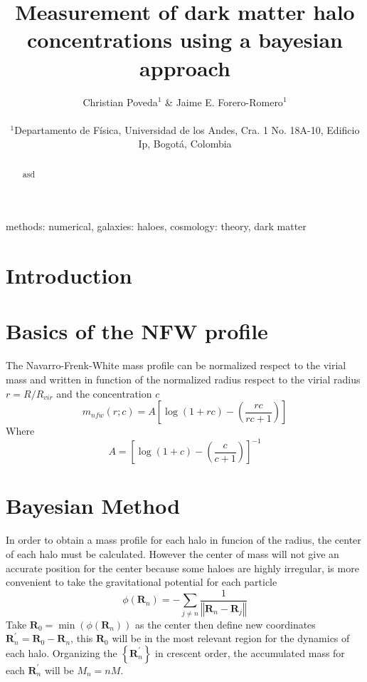 \documentclass[useAMS,usenatbib]{mn2e}
\begin{document}
\title[Bayesian halo concentration]{Measurement of dark matter halo concentrations using a bayesian approach}
\author[Poveda \& Forero-Romero]{
\parbox[t]{\textwidth}{\raggedright
  Christian Poveda$^{1}$ \&
  Jaime E. Forero-Romero$^{1}$
}
\vspace*{6pt}\\
$^{1}$Departamento de F\'{i}sica, Universidad de los Andes, Cra. 1
No. 18A-10, Edificio Ip, Bogot\'a, Colombia\\
}
\maketitle

\begin{abstract}
asd
\end{abstract}
\begin{keywords}
methods: numerical, galaxies: haloes, cosmology: theory, dark
matter
\end{keywords}


\section{Introduction}
\label{sec:introduction}


\citep{NFW}


\section{Basics of the NFW profile}
\label{sec:basics}

The Navarro-Frenk-White mass profile can be normalized respect to the virial mass and written in function of the normalized radius respect to the virial radius $r=R/R_{vir}$ and the concentration $c$ 
\[
m_{nfw}\left(r;c\right)=A\left[\log\left(1+rc\right)-\left(\frac{rc}{rc+1}\right)\right]
\]
Where
\[
A=\left[\log\left(1+c\right)-\left(\frac{c}{c+1}\right)\right]^{-1} 
\]
\section{Bayesian Method}
\label{sec:method}

In order to obtain a mass profile for each halo in funcion of the radius, the center of each halo must be calculated. However the center of mass will not give an accurate position for the center because some haloes are highly irregular, is more convenient to take the gravitational potential for each particle
\[
\phi\left(\boldsymbol{R}_{n}\right)=-\sum_{j\neq n}\frac{1}{\left\Vert \boldsymbol{R}_{n}-\boldsymbol{R}_{j}\right\Vert }
\]
Take $\boldsymbol{R}_{0}=\min\left(\phi\left(\boldsymbol{R}_{n}\right)\right)$ as the center then define new coordinates $\boldsymbol{R}_{n}^{\prime}=\boldsymbol{R}_{0}-\boldsymbol{R}_{n}$, this $\boldsymbol{R}_{0}$ will be in the most relevant region for the dynamics of each halo. Organizing the $\left\{ \boldsymbol{R}_{n}^{\prime}\right\} $ in crescent order, the accumulated mass for each $\boldsymbol{R}_{n}^{\prime}$ will be $M_{n}=nM$.
\end{document}
